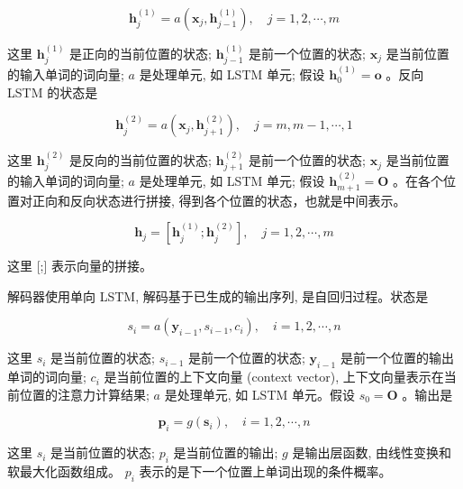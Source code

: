 \documentclass[10pt]{article}
\begin{document}
\begin{equation*}
\boldsymbol{h}_{j}^{(1)}=a\left(\boldsymbol{x}_{j}, \boldsymbol{h}_{j-1}^{(1)}\right), \quad j=1,2, \cdots, m \tag{26.13}
\end{equation*}


这里 $\boldsymbol{h}_{j}^{(1)}$ 是正向的当前位置的状态; $\boldsymbol{h}_{j-1}^{(1)}$ 是前一个位置的状态; $\boldsymbol{x}_{j}$ 是当前位置的输入单词的词向量; $a$ 是处理单元, 如 LSTM 单元; 假设 $\boldsymbol{h}_{0}^{(1)}=\boldsymbol{o}$ 。反向 LSTM 的状态是


\begin{equation*}
\boldsymbol{h}_{j}^{(2)}=a\left(\boldsymbol{x}_{j}, \boldsymbol{h}_{j+1}^{(2)}\right), \quad j=m, m-1, \cdots, 1 \tag{26.14}
\end{equation*}


这里 $\boldsymbol{h}_{j}^{(2)}$ 是反向的当前位置的状态; $\boldsymbol{h}_{j+1}^{(2)}$ 是前一个位置的状态; $\boldsymbol{x}_{j}$ 是当前位置的输入单词的词向量; $a$ 是处理单元, 如 LSTM 单元; 假设 $\boldsymbol{h}_{m+1}^{(2)}=\boldsymbol{O}$ 。在各个位置对正向和反向状态进行拼接, 得到各个位置的状态，也就是中间表示。


\begin{equation*}
\boldsymbol{h}_{j}=\left[\boldsymbol{h}_{j}^{(1)} ; \boldsymbol{h}_{j}^{(2)}\right], \quad j=1,2, \cdots, m \tag{26.15}
\end{equation*}


这里 [;] 表示向量的拼接。

解码器使用单向 LSTM, 解码基于已生成的输出序列, 是自回归过程。状态是


\begin{equation*}
s_{i}=a\left(\boldsymbol{y}_{i-1}, s_{i-1}, c_{i}\right), \quad i=1,2, \cdots, n \tag{26.16}
\end{equation*}


这里 $s_{i}$ 是当前位置的状态; $s_{i-1}$ 是前一个位置的状态; $\boldsymbol{y}_{i-1}$ 是前一个位置的输出单词的词向量; $c_{i}$ 是当前位置的上下文向量 (context vector), 上下文向量表示在当前位置的注意力计算结果; $a$ 是处理单元, 如 LSTM 单元。假设 $s_{0}=\boldsymbol{O}$ 。输出是


\begin{equation*}
\boldsymbol{p}_{i}=g\left(\boldsymbol{s}_{i}\right), \quad i=1,2, \cdots, n \tag{26.17}
\end{equation*}


这里 $s_{i}$ 是当前位置的状态; $p_{i}$ 是当前位置的输出; $g$ 是输出层函数, 由线性变换和软最大化函数组成。 $p_{i}$ 表示的是下一个位置上单词出现的条件概率。
\end{document}

